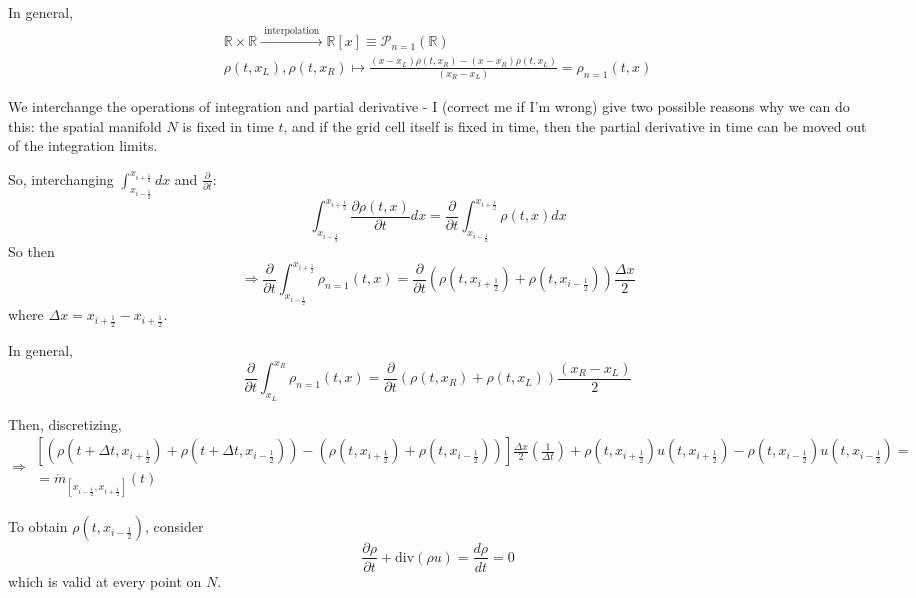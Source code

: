\documentclass[10pt]{amsart}
\begin{document}
\begin{multicols*}{2}
In general,
\[
\begin{gathered}
  \mathbb{R} \times \mathbb{R} \xrightarrow{ \text{ interpolation }} \mathbb{R}[x] \equiv \mathcal{P}_{n=1}(\mathbb{R}) \\ 
 \rho(t,x_L), \rho(t, x_R) \mapsto \frac{ (x - x_L ) \rho(t, x_R) - (x - x_R )\rho(t,x_L) }{ (x_R-x_L) } = \rho_{n=1}(t,x)
\end{gathered}
\]


We interchange the operations of integration and partial derivative - I (correct me if I'm wrong) give two possible reasons why we can do this: the spatial manifold $N$ is fixed in time $t$, and if the grid cell itself is fixed in time, then the partial derivative in time can be moved out of the integration limits.

So, interchanging $\int_{x_{i -\frac{1}{2}}}^{x_{i +\frac{1}{2}}} dx$ and $\frac{ \partial }{ \partial t}$:
\[
\int_{x_{i -\frac{1}{2}}}^{x_{i +\frac{1}{2}}} \frac{ \partial \rho(t,x) }{ \partial t} dx = \frac{ \partial }{ \partial t} \int_{x_{i -\frac{1}{2}}}^{x_{i +\frac{1}{2}}} \rho(t,x)dx
\]
So then
\[
\Longrightarrow \frac{ \partial }{ \partial t} \int_{x_{i -\frac{1}{2}}}^{x_{i +\frac{1}{2}}} \rho_{n=1}(t,x) = \frac{ \partial }{ \partial t} ( \rho(t,x_{i+\frac{1}{2} }  )  + \rho(t,x_{i-\frac{1}{2} } ) ) \frac{ \Delta x}{2}
\]
where $\Delta x = x_{i+\frac{1}{2} } - x_{i+\frac{1}{2} } $.

In general,
\[
\frac{ \partial }{ \partial t} \int_{x_L}^{x_R} \rho_{n=1}(t,x) = \frac{ \partial }{ \partial t}( \rho(t,x_R) + \rho(t,x_L) ) \frac{ (x_R - x_L) }{2}
\]


Then, discretizing,
\begin{equation}
  \Longrightarrow \begin{gathered}
    \left[ (\rho(t+\Delta t, x_{i+\frac{1}{2} } ) + \rho(t+\Delta t, x_{i-\frac{1}{2} } ) ) - (\rho(t, x_{i+\frac{1}{2} } ) + \rho(t, x_{i-\frac{1}{2} } ) ) \right] \frac{\Delta x}{2} \left( \frac{1}{\Delta t} \right) + \rho(t,x_{i+\frac{1}{2} } )u(t,x_{i+\frac{1}{2} } ) - \rho(t,x_{i-\frac{1}{2} } )u(t,x_{i-\frac{1}{2} } ) = \\
    = \dot{m}_{[x_{i-\frac{1}{2} }, x_{i+\frac{1}{2} }] }(t)
  \end{gathered}
  \end{equation}

To obtain $\rho(t,x_{i-\frac{1}{2}})$, consider
\[
\frac{ \partial \rho}{ \partial t} + \text{div}(\rho u) = \frac{d\rho}{dt} = 0 
\]
which is valid at every point on $N$.


\end{multicols*}
\end{document}
